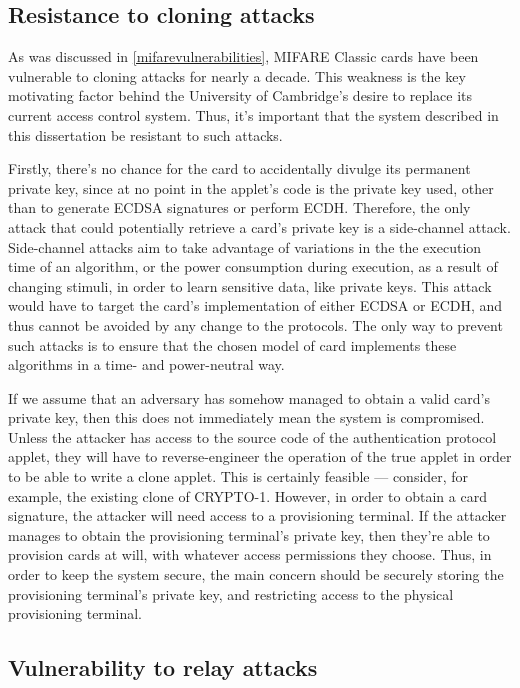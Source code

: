 \documentclass[12pt,a4paper,twoside,openright]{report}
\begin{document}
\subsection{Resistance to cloning attacks}

As was discussed in \autoref{mifarevulnerabilities}, MIFARE Classic cards have been vulnerable to cloning attacks for nearly a decade. This weakness is the key motivating factor behind the University of Cambridge's desire to replace its current access control system. Thus, it's important that the system described in this dissertation be resistant to such attacks.

Firstly, there's no chance for the card to accidentally divulge its permanent private key, since at no point in the applet's code is the private key used, other than to generate ECDSA signatures or perform ECDH. Therefore, the only attack that could potentially retrieve a card's private key is a side-channel attack. Side-channel attacks aim to take advantage of variations in the the execution time of an algorithm, or the power consumption during execution, as a result of changing stimuli, in order to learn sensitive data, like private keys. This attack would have to target the card's implementation of either ECDSA or ECDH, and thus cannot be avoided by any change to the protocols. The only way to prevent such attacks is to ensure that the chosen model of card implements these algorithms in a time- and power-neutral way.

If we assume that an adversary has somehow managed to obtain a valid card's private key, then this does not immediately mean the system is compromised. Unless the attacker has access to the source code of the authentication protocol applet, they will have to reverse-engineer the operation of the true applet in order to be able to write a clone applet. This is certainly feasible --- consider, for example, the existing clone of CRYPTO-1. However, in order to obtain a card signature, the attacker will need access to a provisioning terminal. If the attacker manages to obtain the provisioning terminal's private key, then they're able to provision cards at will, with whatever access permissions they choose. Thus, in order to keep the system secure, the main concern should be securely storing the provisioning terminal's private key, and restricting access to the physical provisioning terminal.

\subsection{Vulnerability to relay attacks}
\end{document}
